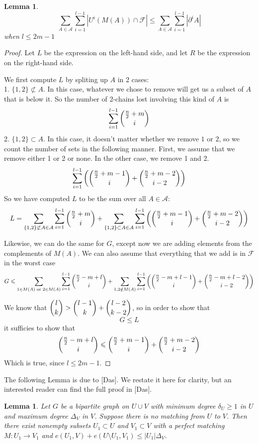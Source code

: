 \documentclass[12pt]{article}
\theoremstyle{plain}
\newtheorem{lemma}[theorem]{Lemma}
\theoremstyle{definition}
\theoremstyle{remark}
\newcommand{\F}{\mathcal{F}}
\newcommand{\A}{\mathcal{A}}
\begin{document}

\begin{lemma} 
\label{lemma1}
\[ \sum_{A\in \A}\sum_{i = 1}^{l-1} |U^i(M(A)) \cap \F| \leq \sum_{A \in \A}\sum_{i = 1}^{l-1} |\partial^i A | \]
when $l \leq 2m-1$
\end{lemma}

\begin{proof}
Let $L$ be the expression on the left-hand side, and let $R$ be the expression on the right-hand side.

We first compute $L$ by spliting up $A$ in 2 cases:\\
1. $\{ 1, 2 \} \not\subset A$. In this case, whatever we chose to remove will get us a subset of $A$ that is below it. So the number of 2-chains lost involving this kind of $A$ is
\[ \sum_{i=1}^{l-1} \dbinom{\frac{n}{2} + m}{i} \]
2. $\{ 1, 2 \} \subset A$. In this case, it doesn't matter whether we remove $1$ or $2$, so we count the number of sets in the following manner. First, we assume that we remove either 1 or 2 or none. In the other case, we remove 1 and 2.
\[ \sum_{i=1}^{l-1} \left(\dbinom{\frac{n}{2} + m - 1}{i} + \dbinom{\frac{n}{2}+m-2}{i-2} \right) \]
So we have computed $L$ to be the sum over all $A \in \A$:
\[ L = \sum_{\{1, 2\} \not\subset A \in \A} \sum_{i=1}^{l-1} \dbinom{\frac{n}{2} + m}{i} + \sum_{\{1, 2\} \subset A \in \A} \sum_{i=1}^{l-1} \left( \dbinom{\frac{n}{2}+m-1}{i} + \dbinom{\frac{n}{2}+m-2}{i-2}\right) \]

Likewise, we can do the same for $G$, except now we are adding elements from the complements of $M(A)$. We can also assume that everything that we add is in $\F$ in the worst case
\[ G \leq \sum_{1 \in M(A) \text{ or } 2 \in M(A)} \sum_{i=1}^{l-1} \dbinom{\frac{n}{2}-m+l}{i} + \sum_{1, 2 \notin M(A)} \sum_{i=1}^{l-1} \left( \dbinom{\frac{n}{2}-m+l-1}{i} + \dbinom{\frac{n}{2}-m+l-2}{i-2} \right) \]

We know that $\dbinom{l}{k} > \dbinom{l-1}{k} + \dbinom{l-2}{k-2}$, so in order to show that 
\[ G \leq L \]
it sufficies to show that
\[ \dbinom{\frac{n}{2}-m+l}{i} \leq \dbinom{\frac{n}{2}+m-1}{i} + \dbinom{\frac{n}{2}+m-2}{i-2} \]
Which is true, since $l \leq 2m-1$.
\end{proof}

The following Lemma is due to [Das]. We restate it here for clarity, but an interested reader can find the full proof in [Das].

\begin{lemma}
\label{lemma2}
Let $G$ be a bipartite graph on $U \cup V$ with minimum degree $\delta_U \geq 1$ in $U$ and maximum degree $\Delta_V$ in $V$. Suppose there is no matching from $U$ to $V$. Then there exist nonempty subsets $U_1 \subset U$ and $V_1 \subset V$ with a perfect matching $M: U_1 \to V_1$ and $e(U_1,V) + e(U \setminus U_1,V_1) \leq |U_1| \Delta_V$.
\end{lemma}
\end{document}
